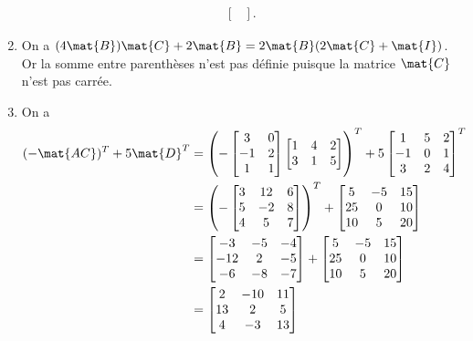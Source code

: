 \begin{exercice}
\begin{sol}
\begin{enumerate}
\begin{align*}
\begin{bmatrix}
        \end{bmatrix}.
      \end{align*}
    \item On a $(4 \mat{B}) \mat{C} + 2 \mat{B} = 2 \mat{B}(2\mat{C} +
      \mat{I})$. Or la somme entre parenthèses n'est pas définie
      puisque la matrice $\mat{C}$ n'est pas carrée.
    \item On a
      \begin{align*}
        (-\mat{AC})^T + 5 \mat{D}^T
        &=
        \left(
          -
          \begin{bmatrix}
            3 & 0 \\ -1 & 2 \\ 1 & 1
          \end{bmatrix}
          \begin{bmatrix}
            1 & 4 & 2 \\ 3 & 1 & 5
          \end{bmatrix}
        \right)^T + 5
        \begin{bmatrix}
          1 & 5 & 2 \\ -1 & 0 & 1 \\ 3 & 2 & 4
        \end{bmatrix}^T \\
        &=
        \left(
          -
          \begin{bmatrix}
            3 & 12 & 6 \\ 5 & -2 & 8 \\ 4 & 5 & 7
          \end{bmatrix}
        \right)^T +
        \begin{bmatrix}
          5 & -5 & 15 \\ 25 & 0 & 10 \\ 10 & 5 & 20
        \end{bmatrix} \\
        &=
        \begin{bmatrix}
          -3 & -5 & -4 \\ -12 & 2 & -5 \\ -6 & -8 & -7
        \end{bmatrix} +
        \begin{bmatrix}
          5 & -5 & 15 \\ 25 & 0 & 10 \\ 10 & 5 & 20
        \end{bmatrix} \\
        &=
        \begin{bmatrix}
          2 & -10 & 11 \\ 13 & 2 & 5 \\ 4 & -3 & 13

\end{bmatrix}
\end{align*}
\end{enumerate}
\end{sol}
\end{exercice}

